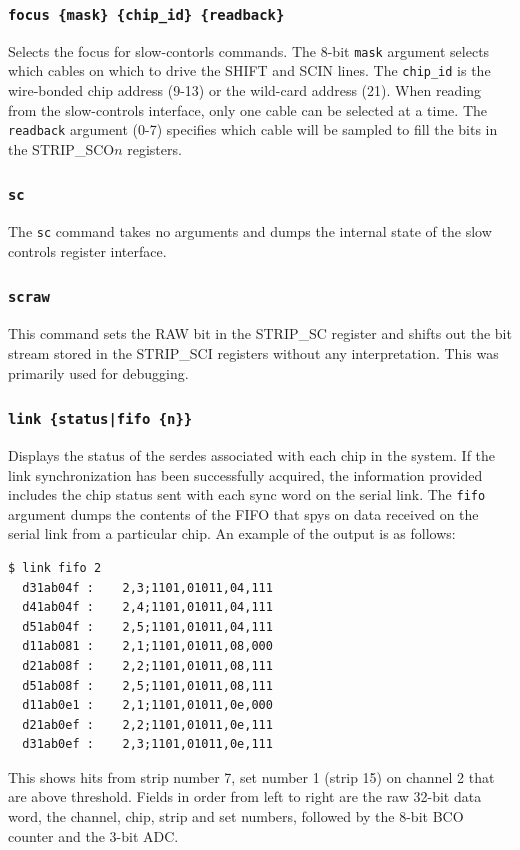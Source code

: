 \documentclass[11pt]{article}
\begin{document}
\subsubsection{\tt focus \{mask\} \{chip\_id\} \{readback\}}
Selects the focus for slow-contorls commands.  The 8-bit {\tt mask} argument selects which cables
on which to drive the SHIFT and SCIN lines.  The {\tt chip\_id} is the wire-bonded chip address
(9-13) or the wild-card address (21).  When reading from the slow-controls interface, only
one cable can be selected at a time.  The {\tt readback} argument (0-7) specifies which cable
will be sampled to fill the bits in the STRIP\_SCO$n$ registers.

\subsubsection{\tt sc}
The {\tt sc} command takes no arguments and dumps the internal state of the
slow controls register interface.

\subsubsection{\tt scraw}
This command sets the RAW bit in the STRIP\_SC register and shifts out the bit stream
stored in the STRIP\_SCI registers without any interpretation.   This was primarily used
for debugging.

\subsubsection{\tt link \{status|fifo \{n\}\}}
Displays the status of the serdes associated with each chip in the system.
If the link synchronization has been successfully acquired, the information
provided includes the chip status sent with each sync word on the serial link.
The {\tt fifo} argument dumps the contents of the FIFO that spys on data
received on the serial link from a particular chip.  An example of the output
is as follows:
\begin{verbatim}
$ link fifo 2
  d31ab04f :    2,3;1101,01011,04,111
  d41ab04f :    2,4;1101,01011,04,111
  d51ab04f :    2,5;1101,01011,04,111
  d11ab081 :    2,1;1101,01011,08,000
  d21ab08f :    2,2;1101,01011,08,111
  d51ab08f :    2,5;1101,01011,08,111
  d11ab0e1 :    2,1;1101,01011,0e,000
  d21ab0ef :    2,2;1101,01011,0e,111
  d31ab0ef :    2,3;1101,01011,0e,111
\end{verbatim}
This shows hits from strip number 7, set number 1 (strip 15) on channel
2 that are above threshold.  Fields in order from left to right are
the raw 32-bit data word, the channel, chip, strip and set numbers,
followed by the 8-bit BCO counter and the 3-bit ADC.
\end{document}
